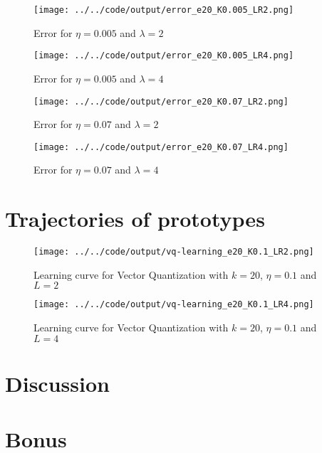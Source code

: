 \documentclass[twoside, a4paper, fleqn, reqno]{article}
\begin{document}
\begin{figure}[H]
	\centering
	\texttt{[image: ../../code/output/error\_e20\_K0.005\_LR2.png]}
	\caption{Error for $\eta = 0.005$ and $\lambda = 2$}
	\label{fig:error_e20_K0.005_LR2}
\end{figure}

\begin{figure}[H]
	\centering
	\texttt{[image: ../../code/output/error\_e20\_K0.005\_LR4.png]}
	\caption{Error for $\eta = 0.005$ and $\lambda = 4$}
	\label{fig:error_e20_K0.005_LR4}
\end{figure}

\begin{figure}[H]
	\centering
	\texttt{[image: ../../code/output/error\_e20\_K0.07\_LR2.png]}
	\caption{Error for $\eta = 0.07$ and $\lambda = 2$}
	\label{fig:error_e20_K0.07_LR2}
\end{figure}

\begin{figure}[H]
	\centering
	\texttt{[image: ../../code/output/error\_e20\_K0.07\_LR4.png]}
	\caption{Error for $\eta = 0.07$ and $\lambda = 4$}
	\label{fig:error_e20_K0.07_LR4}
\end{figure}

\section{Trajectories of prototypes}

\begin{figure}[H]
	\centering
	\texttt{[image: ../../code/output/vq-learning\_e20\_K0.1\_LR2.png]}
	\caption{Learning curve for Vector Quantization with $k=20$, $\eta=0.1$ and $L=2$}
	\label{fig:vq-learning_e20_K0.1_LR2}
\end{figure}

\begin{figure}[H]
	\centering
	\texttt{[image: ../../code/output/vq-learning\_e20\_K0.1\_LR4.png]}
	\caption{Learning curve for Vector Quantization with $k=20$, $\eta=0.1$ and $L=4$}
	\label{fig:vq-learning_e20_K0.1_LR4}
\end{figure}

\section{Discussion}

\section{Bonus}
\end{document}

